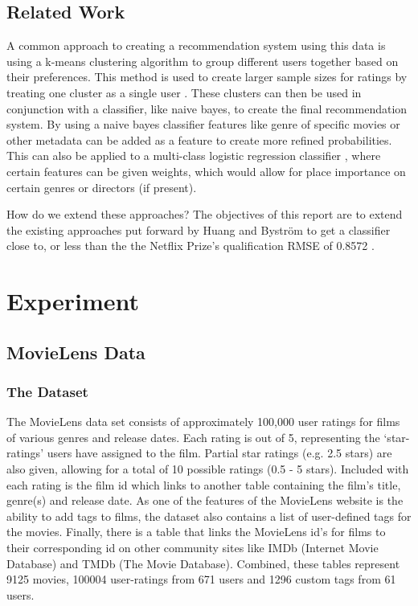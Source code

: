 \documentclass{report}
\begin{document}
	\section{Related Work}
	A common approach to creating a recommendation system using this data is using a k-means clustering algorithm to group different users together based on their preferences. This method is used to create larger sample sizes for ratings by treating one cluster as a single user \autocite{CS229}.
	These clusters can then be used in conjunction with a classifier, like naive bayes, to create the final recommendation system. By using a naive bayes classifier features like genre of specific movies or other metadata can be added as a feature to create more refined probabilities. This can also be applied to a multi-class logistic regression classifier \autocite{Bystrom}, where certain features can be given weights, which would allow for place importance on certain genres or directors (if present).
	
	How do we extend these approaches?
	The objectives of this report are to extend the existing approaches put forward by Huang and Bystr\"om to get a classifier close to, or less than the the Netflix Prize’s qualification RMSE of 0.8572 \cite{NeflixRules}.
	
	\chapter{Experiment}
	\section{MovieLens Data}
	\subsection{The Dataset}
	The MovieLens data set consists of approximately 100,000 user ratings for films of various genres and release dates. Each rating is out of 5, representing the ‘star-ratings’ users have assigned to the film. Partial star ratings (e.g. 2.5 stars) are also given, allowing for a total of 10 possible ratings (0.5 - 5 stars). Included with each rating is the film id which links to another table containing the film’s title, genre(s) and release date. As one of the features of the MovieLens website is the ability to add tags to films, the dataset also contains a list of user-defined tags for the movies. Finally, there is a table that links the MovieLens id’s for films to their corresponding id on other community sites like IMDb (Internet Movie Database) and TMDb (The Movie Database). Combined, these tables represent 9125 movies, 100004 user-ratings from 671 users and 1296 custom tags from 61 users.
\end{document}
